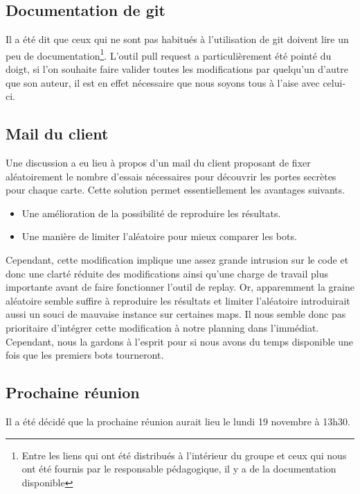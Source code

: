 \documentclass{article}
\begin{document}
\subsection*{Documentation de git}
Il a été dit que ceux qui ne sont pas habitués à l'utilisation de git doivent lire un peu de documentation\footnote{Entre les liens qui ont été distribués à l'intérieur du groupe et ceux qui nous ont été fournis par le responsable pédagogique, il y a de la documentation disponible}. L'outil pull request a particulièrement été pointé du doigt, si l'on souhaite faire valider toutes les modifications par quelqu'un d'autre que son auteur, il est en effet nécessaire que nous soyons tous à l'aise avec celui-ci.

\subsection*{Mail du client}
Une discussion a eu lieu à propos d'un mail du client proposant de fixer aléatoirement le nombre d'essais nécessaires pour découvrir les portes secrètes pour chaque carte. Cette solution permet essentiellement les avantages suivants.
\begin{itemize}
\item Une amélioration de la possibilité de reproduire les résultats.
\item Une manière de limiter l'aléatoire pour mieux comparer les bots.
\end{itemize}
Cependant, cette modification implique une assez grande intrusion sur le code et donc une clarté réduite des modifications ainsi qu'une charge de travail plus importante avant de faire fonctionner l'outil de replay. Or, apparemment la graine aléatoire semble suffire à reproduire les résultats et limiter l'aléatoire introduirait aussi un souci de mauvaise instance sur certaines maps. Il nous semble donc pas prioritaire d'intégrer cette modification à notre planning dans l'immédiat. Cependant, nous la gardons à l'esprit pour si nous avons du temps disponible une fois que les premiers bots tourneront. 

\subsection*{Prochaine réunion}
Il a été décidé que la prochaine réunion aurait lieu le lundi 19 novembre à 13h30.
\end{document}
